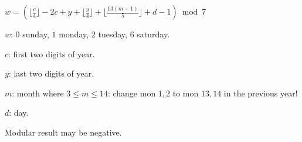$w=(\lfloor\frac{c}{4}\rfloor-2c+y+\lfloor\frac{y}{4}\rfloor+\lfloor\frac{13(m+1)}{5}\rfloor+d-1)\bmod 7$\par
$w$: $0$ sunday, $1$ monday, $2$ tuesday, $6$ saturday.\par
$c$: first two digits of year.\par
$y$: last two digits of year.\par
$m$: month where $3\le m\le 14$: change mon $1,2$ to mon $13,14$ in the previous year!\par
$d$: day.\par
Modular result may be negative.
